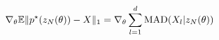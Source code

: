 \documentclass[preview]{standalone}
\begin{document}
\begin{align*}
\special{dvisvgm:raw <g id='unique000'>}\nabla_{\theta} \mathbb{E}\|p^\star(z_N(\theta)) - X\|_1 \special{dvisvgm:raw </g>}\special{dvisvgm:raw <g id='unique001'>}= \nabla_{\theta} \sum_{l=1}^d \text{MAD}(X_l | z_N(\theta))\special{dvisvgm:raw </g>}
\end{align*}
\end{document}
